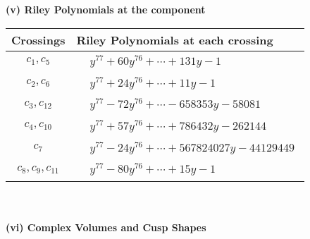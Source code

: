 \documentclass[1p]{elsarticle_modified}
\theoremstyle{definition}
\begin{document}
\newpage\renewcommand{\arraystretch}{1}
\flushleft \textbf{(v) Riley Polynomials at the component}\newline \\
\begin{tabular}{m{50pt}|m{274pt}}
Crossings & \hspace{64pt}Riley Polynomials at each crossing \\
\hline $$\begin{aligned}c_{1},c_{5}\end{aligned}$$&$\begin{aligned}
&y^{77}+60 y^{76}+\cdots+131 y-1
\end{aligned}$\\
\hline $$\begin{aligned}c_{2},c_{6}\end{aligned}$$&$\begin{aligned}
&y^{77}+24 y^{76}+\cdots+11 y-1
\end{aligned}$\\
\hline $$\begin{aligned}c_{3},c_{12}\end{aligned}$$&$\begin{aligned}
&y^{77}-72 y^{76}+\cdots-658353 y-58081
\end{aligned}$\\
\hline $$\begin{aligned}c_{4},c_{10}\end{aligned}$$&$\begin{aligned}
&y^{77}+57 y^{76}+\cdots+786432 y-262144
\end{aligned}$\\
\hline $$\begin{aligned}c_{7}\end{aligned}$$&$\begin{aligned}
&y^{77}-24 y^{76}+\cdots+567824027 y-44129449
\end{aligned}$\\
\hline $$\begin{aligned}c_{8},c_{9},c_{11}\end{aligned}$$&$\begin{aligned}
&y^{77}-80 y^{76}+\cdots+15 y-1
\end{aligned}$\\
\hline
\end{tabular}\\~\\
\newpage\flushleft \textbf{(vi) Complex Volumes and Cusp Shapes}
\end{document}
